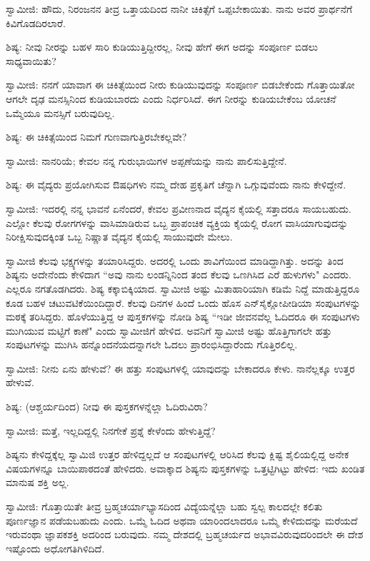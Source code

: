 ಸ್ವಾಮೀಜಿ: ಹೌದು, ನಿರಂಜನನ ತೀವ್ರ ಒತ್ತಾಯದಿಂದ ನಾನೀ ಚಿಕಿತ್ಸೆಗೆ ಒಪ್ಪಬೇಕಾಯಿತು. ನಾನು ಅವರ ಪ್ರಾರ್ಥನೆಗೆ ಕಿವಿಗೊಡದಿರಲಾರೆ.

ಶಿಷ್ಯ: ನೀವು ನೀರನ್ನು ಬಹಳ ಸಾರಿ ಕುಡಿಯುತ್ತಿದ್ದೀರಲ್ಲ, ನೀವು ಹೇಗೆ ಈಗ ಅದನ್ನು ಸಂಪೂರ್ಣ ಬಿಡಲು ಸಾಧ್ಯವಾಯಿತು?

ಸ್ವಾಮೀಜಿ: ನನಗೆ ಯಾವಾಗ ಈ ಚಿಕಿತ್ಸೆಯಿಂದ ನೀರು ಕುಡಿಯುವುದನ್ನು ಸಂಪೂರ್ಣ ಬಿಡಬೇಕೆಂದು ಗೊತ್ತಾಯಿತೋ ಆಗಲೇ ದೃಢ ಮನಸ್ಸಿನಿಂದ ಕುಡಿಯಬಾರದು ಎಂದು ನಿರ್ಧರಿಸಿದೆ. ಈಗ ನೀರನ್ನು ಕುಡಿಯಬೇಕೆಂಬ ಯೋಚನೆ ಒಮ್ಮೆಯೂ ಮನಸ್ಸಿಗೆ ಬರುವುದಿಲ್ಲ.

ಶಿಷ್ಯ: ಈ ಚಿಕಿತ್ಸೆಯಿಂದ ನಿಮಗೆ ಗುಣವಾಗುತ್ತಿರಬೇಕಲ್ಲವೇ?

ಸ್ವಾಮೀಜಿ: ನಾನರಿಯೆ; ಕೇವಲ ನನ್ನ ಗುರುಭಾಯಿಗಳ ಅಪ್ಪಣೆಯನ್ನು ನಾನು ಪಾಲಿಸುತ್ತಿದ್ದೇನೆ.

ಶಿಷ್ಯ: ಈ ವೈದ್ಯರು ಪ್ರಯೋಗಿಸುವ ಔಷಧಿಗಳು ನಮ್ಮ ದೇಹ ಪ್ರಕೃತಿಗೆ ಚೆನ್ನಾಗಿ ಒಗ್ಗುವುವೆಂದು ನಾನು ಕೇಳಿದ್ದೇನೆ.

ಸ್ವಾಮೀಜಿ: ಇದರಲ್ಲಿ ನನ್ನ ಭಾವನೆ ಏನೆಂದರೆ, ಕೇವಲ ಪ್ರವೀಣನಾದ ವೈದ್ಯನ ಕೈಯಲ್ಲಿ ಸತ್ತಾದರೂ ಸಾಯಬಹುದು. ಎಲ್ಲೋ ಕೆಲವು ರೋಗಗಳನ್ನು ವಾಸಿಮಾಡಿರುವ ಒಬ್ಬ ಪ್ರಾಪಂಚಿಕ ವ್ಯಕ್ತಿಯ ಕೈಯಲ್ಲಿ ರೋಗ ವಾಸಿಯಾಗುವುದನ್ನು ನಿರೀಕ್ಷಿಸುವುದಕ್ಕಿಂತ ಒಬ್ಬ ನಿಷ್ಣಾತ ವೈದ್ಯನ ಕೈಯಲ್ಲಿ ಸಾಯುವುದೇ ಮೇಲು.

ಸ್ವಾಮೀಜಿ ಕೆಲವು ಭಕ್ಷ್ಯಗಳನ್ನು ತಯಾರಿಸಿದ್ದರು. ಅದರಲ್ಲಿ ಒಂದು ಶಾವಿಗೆಯಿಂದ ಮಾಡಿದ್ದಾಗಿತ್ತು. ಅದನ್ನು ತಿಂದ ಶಿಷ್ಯನು ಅದೇನೆಂದು ಕೇಳಿದಾಗ “ಅವು ನಾನು ಲಂಡನ್ನಿನಿಂದ ತಂದ ಕೆಲವು ಒಣಗಿಸಿದ ಎರೆ ಹುಳುಗಳು" ಎಂದರು. ಎಲ್ಲರೂ ನಗತೊಡಗಿದರು. ಶಿಷ್ಯ ಕಕ್ಕಾಬಿಕ್ಕಿಯಾದ. ಸ್ವಾಮೀಜಿ ಅಷ್ಟು ಮಿತಾಹಾರಿಯಾಗಿ ಕಡಿಮೆ ನಿದ್ದೆ ಮಾಡುತ್ತಿದ್ದರೂ ಕೂಡ ಬಹಳ ಚಟುವಟಿಕೆಯಿಂದಿದ್ದಾರೆ. ಕೆಲವು ದಿನಗಳ ಹಿಂದೆ ಒಂದು ಹೊಸ ಎನ್‌ಸೈಕ್ಲೋಪೀಡಿಯಾ ಸಂಪುಟಗಳನ್ನು ಮಠಕ್ಕೆ ತರಿಸಿದ್ದರು. ಹೊಳೆಯುತ್ತಿದ್ದ ಆ ಪುಸ್ತಕಗಳನ್ನು ನೋಡಿ ಶಿಷ್ಯ “ಇಡೀ ಜೀವನವೆಲ್ಲ ಓದಿದರೂ ಈ ಸಂಪುಟಗಳು ಮುಗಿಯುವ ಮಟ್ಟಿಗೆ ಕಾಣೆ" ಎಂದು ಸ್ವಾಮೀಜಿಗೆ ಹೇಳಿದ. ಅವನಿಗೆ ಸ್ವಾಮೀಜಿ ಅಷ್ಟು ಹೊತ್ತಿಗಾಗಲೇ ಹತ್ತು ಸಂಪುಟಗಳನ್ನು ಮುಗಿಸಿ ಹನ್ನೊಂದನೆಯದನ್ನಾಗಲೇ ಓದಲು ಪ್ರಾರಂಭಿಸಿದ್ದಾರೆಂದು ಗೊತ್ತಿರಲಿಲ್ಲ.

ಸ್ವಾಮೀಜಿ: ನೀನು ಏನು ಹೇಳುವೆ? ಈ ಹತ್ತು ಸಂಪುಟಗಳಲ್ಲಿ ಯಾವುದನ್ನು ಬೇಕಾದರೂ ಕೇಳು. ನಾನೆಲ್ಲಕ್ಕೂ ಉತ್ತರ ಹೇಳುವೆ.

ಶಿಷ್ಯ: (ಆಶ್ಚರ್ಯದಿಂದ) ನೀವು ಈ ಪುಸ್ತಕಗಳನ್ನೆಲ್ಲಾ ಓದಿರುವಿರಾ?

ಸ್ವಾಮೀಜಿ: ಮತ್ತೆ, ಇಲ್ಲದಿದ್ದಲ್ಲಿ ನಿನಗೇಕೆ ಪ್ರಶ್ನೆ ಕೇಳೆಂದು ಹೇಳುತ್ತಿದ್ದೆ?

ಶಿಷ್ಯನು ಕೇಳಿದ್ದಕ್ಕೆಲ್ಲ ಸ್ವಾಮಿಜಿ ಉತ್ತರ ಹೇಳಿದ್ದಲ್ಲದೆ ಆ ಸಂಪುಟಗಳಲ್ಲಿ ಆರಿಸಿದ ಕೆಲವು ಕ್ಲಿಷ್ಟ ಶೈಲಿಯಲ್ಲಿದ್ದ ಅನೇಕ ವಿಷಯಗಳನ್ನೂ ಬಾಯಿಪಾಠದಂತೆ ಹೇಳಿದರು. ಅವಾಕ್ಕಾದ ಶಿಷ್ಯನು ಪುಸ್ತಕಗಳನ್ನು ಒತ್ತಟ್ಟಿಗಿಟ್ಟು ಹೇಳಿದ: ಇದು ಖಂಡಿತ ಮಾನುಷ ಶಕ್ತಿ ಅಲ್ಲ.

ಸ್ವಾಮೀಜಿ: ಗೊತ್ತಾಯಿತೇ ತೀವ್ರ ಬ್ರಹ್ಮಚರ್ಯಾಭ್ಯಾಸದಿಂದ ವಿದ್ಯೆಯನ್ನೆಲ್ಲಾ ಬಹು ಸ್ವಲ್ಪ ಕಾಲದಲ್ಲೇ ಕಲಿತು ಪೂರ್ಣಜ್ಞಾನ ಪಡೆಯಬಹುದು ಎಂದು. ಒಮ್ಮೆ ಓದಿದ ಅಥವಾ ಯಾರಿಂದಲಾದರೂ ಒಮ್ಮೆ ಕೇಳಿದುದನ್ನು ಮರೆಯದೆ ಇರುವಂಥಾ ಜ್ಞಾಪಕಶಕ್ತಿ ಅದರಿಂದ ಬರುವುದು. ನಮ್ಮ ದೇಶದಲ್ಲಿ ಬ್ರಹ್ಮಚರ್ಯದ ಅಭಾವವಿರುವುದರಿಂದಲೇ ಈ ದೇಶ ಇಷ್ಟೊಂದು ಅಧೋಗತಿಗಿಳಿದಿದೆ.

